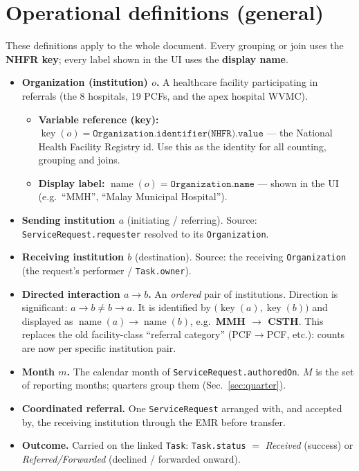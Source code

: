 \documentclass[11pt]{article}
\newcommand{\key}{\operatorname{key}}
\newcommand{\name}{\operatorname{name}}
\newcommand{\fhir}[1]{\texttt{#1}}
\begin{document}
\section{Operational definitions (general)}
These definitions apply to the whole document. Every grouping or join uses the \textbf{NHFR key}; every label shown in the UI uses the \textbf{display name}.

\begin{itemize}
  \item \textbf{Organization (institution) $o$.} A healthcare facility participating in referrals (the 8 hospitals, 19 PCFs, and the apex hospital WVMC).
  \begin{itemize}
    \item \textbf{Variable reference (key):} $\key(o) = \fhir{Organization.identifier(NHFR).value}$ --- the National Health Facility Registry id. Use this as the identity for all counting, grouping and joins.
    \item \textbf{Display label:} $\name(o) = \fhir{Organization.name}$ --- shown in the UI (e.g.\ ``MMH'', ``Malay Municipal Hospital'').
  \end{itemize}
  \item \textbf{Sending institution $a$} (initiating / referring). Source: \fhir{ServiceRequest.requester} resolved to its \fhir{Organization}.
  \item \textbf{Receiving institution $b$} (destination). Source: the receiving \fhir{Organization} (the request's performer / \fhir{Task.owner}).
  \item \textbf{Directed interaction $a\!\to\! b$.} An \emph{ordered} pair of institutions. Direction is significant: $a\!\to\! b \neq b\!\to\! a$. It is identified by $\bigl(\key(a),\key(b)\bigr)$ and displayed as $\name(a)\!\to\!\name(b)$, e.g.\ \textbf{MMH $\to$ CSTH}. This replaces the old facility-class ``referral category'' (PCF$\to$PCF, etc.): counts are now per specific institution pair.
  \item \textbf{Month $m$.} The calendar month of \fhir{ServiceRequest.authoredOn}. $M$ is the set of reporting months; quarters group them (Sec.~\ref{sec:quarter}).
  \item \textbf{Coordinated referral.} One \fhir{ServiceRequest} arranged with, and accepted by, the receiving institution through the EMR before transfer.
  \item \textbf{Outcome.} Carried on the linked \fhir{Task}: \fhir{Task.status} $=$ \emph{Received} (success) or \emph{Referred/Forwarded} (declined / forwarded onward).
\end{itemize}
\end{document}
